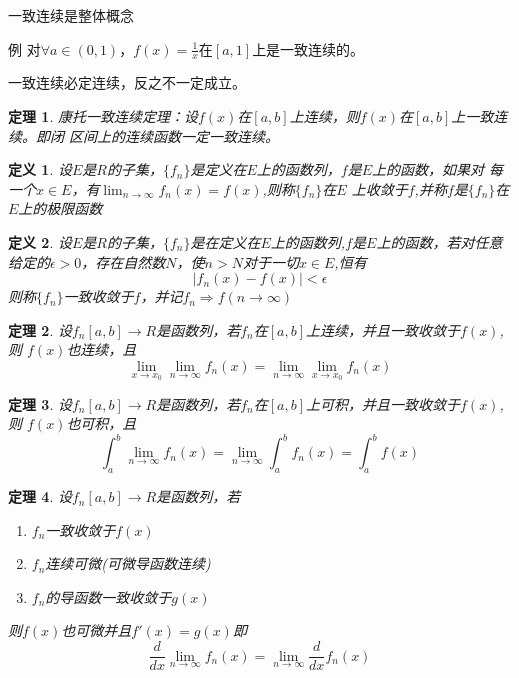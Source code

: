 \documentclass[UTF8]{ctexbook}
\newtheorem{definition}{定义}[chapter]
\newtheorem{thm}{定理}[chapter]
\begin{document}
一致连续是整体概念

例 对$\forall a \in (0,1)$，$f(x) = \frac1x $在$[a,1]$上是一致连续的。

一致连续必定连续，反之不一定成立。

\begin{thm}
    康托一致连续定理：设$f(x)$在$[a,b]$上连续，则$f(x)$在$[a,b]$上一致连续。即闭
    区间上的连续函数一定一致连续。
\end{thm}

\begin{definition}
    设$E$是$R$的子集，$\{f_n\}$是定义在$E$上的函数列，$f$是$E$上的函数，如果对
    每一个$x \in E$，有$\lim_{n \to \infty} f_n(x)=f(x) $,则称$\{f_n\}$在$E$
    上收敛于$f$,并称$f$是$\{f_n\}$在$E$上的极限函数
\end{definition}

\begin{definition}
    设$E$是$R$的子集，$\{f_n\}$是在定义在$E$上的函数列,$f$是$E$上的函数，若对任意
    给定的$\epsilon > 0$，存在自然数$N$，使$n > N$对于一切$x \in E$,恒有
    \[| f_n(x) - f(x) | < \epsilon\]
    则称$\{f_n\}$一致收敛于$f$，并记$f_n \Rightarrow f (n \to \infty)$
\end{definition}


\begin{thm}
    设$f_n [a,b] \to R$是函数列，若$f_n$在$[a,b]$上连续，并且一致收敛于$f(x)$,则
    $f(x)$也连续，且
    \[\lim_{x \to x_0} \lim_{n \to \infty}f_n(x) =
    \lim_{n \to \infty}\lim_{x \to x_0} f_n(x)\]
\end{thm}

\begin{thm}
    设$f_n [a,b] \to R$是函数列，若$f_n$在$[a,b]$上可积，并且一致收敛于$f(x)$,则
    $f(x)$也可积，且
    \[\int_a^b \lim_{n \to \infty}f_n(x) =
    \lim_{n \to \infty}\int_a^b f_n(x) = \int_a^b f(x)\]
\end{thm}

\begin{thm}
    设$f_n [a,b] \to R$是函数列，若
    \begin{enumerate}
        \item $f_n$一致收敛于$f(x)$
        \item $f_n$连续可微(可微导函数连续)
        \item $f_n$的导函数一致收敛于$g(x)$
    \end{enumerate}
    则$f(x)$也可微并且$f'(x) = g(x)$即
    \[ \frac{d}{dx} \lim_{n \to \infty} f_n(x) = \lim_{n \to \infty} 
    \frac{d}{dx} f_n(x)\]
\end{thm}
\end{document}
